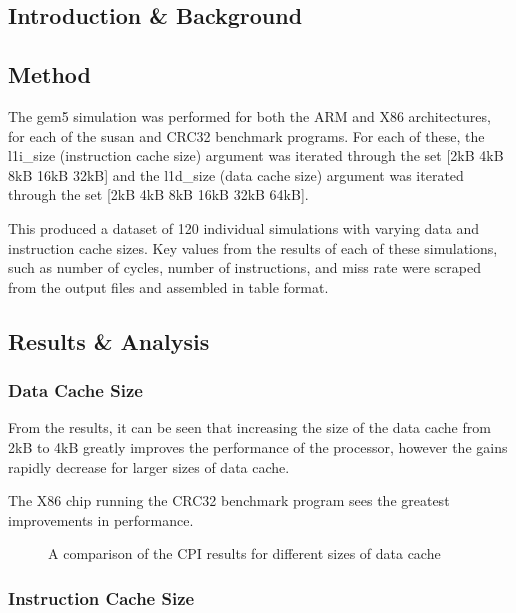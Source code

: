 
\subsection{Introduction \& Background}



\subsection{Method}

The gem5 simulation was performed for both the ARM and X86 architectures, for
each of the susan and CRC32 benchmark programs. For each of these, the l1i\_size 
(instruction cache size) argument was iterated through the set [2kB 4kB 8kB 16kB 32kB]
and the l1d\_size (data cache size) argument was iterated through the set [2kB 4kB 8kB 
16kB 32kB 64kB].

This produced a dataset of 120 individual simulations with varying data and instruction
cache sizes.
Key values from the results of each of these simulations, such as number of cycles, 
number of instructions, and miss rate were scraped from the output files and assembled 
in table format.

\subsection{Results \& Analysis}

\subsubsection{Data Cache Size}

From the results, it can be seen that increasing the size of the data cache from 2kB to 
4kB greatly improves the performance of the processor, however the gains rapidly 
decrease for larger sizes of data cache.

The X86 chip running the CRC32 benchmark program sees the greatest improvements in 
performance.

\begin{figure}[H]
    \centering
    
    \caption{A comparison of the CPI results for different sizes of data cache}
    \label{fig:parta-l1d}
\end{figure}

\subsubsection{Instruction Cache Size}

